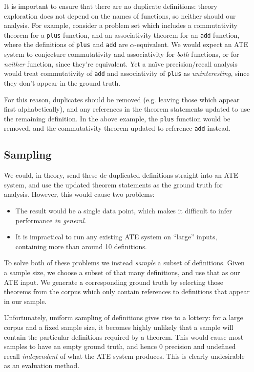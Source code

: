 It is important to ensure that there are no duplicate definitions: theory
exploration does not depend on the names of functions, so neither should our
analysis. For example, consider a problem set which includes a commutativity
theorem for a \texttt{plus} function, and an associativity theorem for an
\texttt{add} function, where the definitions of \texttt{plus} and \texttt{add}
are $\alpha$-equivalent. We would expect an ATE system to conjecture
commutativity and associativity for \emph{both} functions, or for \emph{neither}
function, since they're equivalent. Yet a na\"ive precision/recall analysis
would treat commutativity of \texttt{add} and associativity of \texttt{plus} as
\emph{uninteresting}, since they don't appear in the ground truth.

For this reason, duplicates should be removed (e.g. leaving those which appear
first alphabetically), and any references in the theorem statements updated to
use the remaining definition. In the above example, the \texttt{plus} function
would be removed, and the commutativity theorem updated to reference
\texttt{add} instead.

\subsection{Sampling}

We could, in theory, send these de-duplicated definitions straight into an ATE
system, and use the updated theorem statements as the ground truth for analysis.
However, this would cause two problems:

\begin{itemize}
\item The result would be a single data point, which makes it difficult to
  infer performance \emph{in general}.
\item It is impractical to run any existing ATE system on ``large'' inputs,
  containing more than around 10 definitions.
\end{itemize}

To solve both of these problems we instead \emph{sample} a subset of
definitions. Given a sample size, we choose a subset of that many definitions,
and use that as our ATE input. We generate a corresponding ground truth by
selecting those theorems from the corpus which only contain references to
definitions that appear in our sample.

Unfortunately, uniform sampling of definitions gives rise to a lottery: for a
large corpus and a fixed sample size, it becomes highly unlikely that a sample
will contain the particular definitions required by a theorem. This would cause
most samples to have an empty ground truth, and hence $0$ precision and
undefined recall \emph{independent} of what the ATE system produces. This is
clearly undesirable as an evaluation method.

